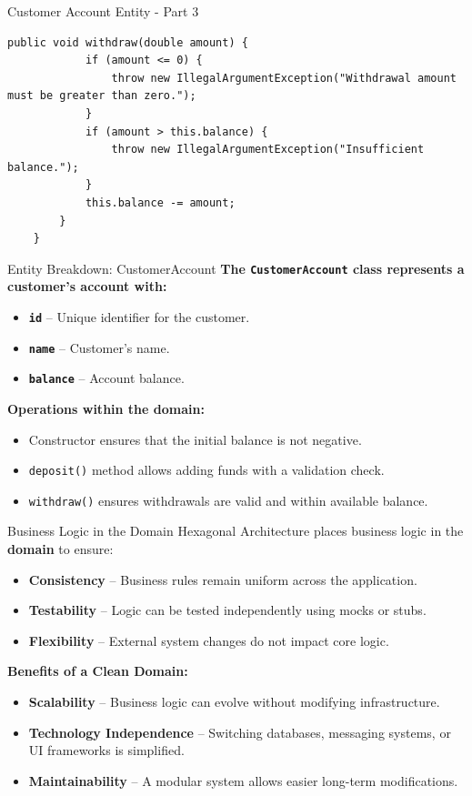 \documentclass[aspectratio=169, table]{beamer}
\begin{document}
\begin{frame}[fragile]{Customer Account Entity - Part 3}
	\vspace{20pt}
	\begin{lstlisting}[style=JavaStyle]
		public void withdraw(double amount) {
			if (amount <= 0) {
				throw new IllegalArgumentException("Withdrawal amount must be greater than zero.");
			}
			if (amount > this.balance) {
				throw new IllegalArgumentException("Insufficient balance.");
			}
			this.balance -= amount;
		}
	}
\end{lstlisting}
\end{frame}


\begin{frame}[fragile]{Entity Breakdown: CustomerAccount}
	\vspace{20pt}
	\textbf{The \texttt{CustomerAccount} class represents a customer’s account with:}
	\begin{itemize}
		\item \textbf{\texttt{id}} – Unique identifier for the customer.
		\item \textbf{\texttt{name}} – Customer’s name.
		\item \textbf{\texttt{balance}} – Account balance.
	\end{itemize}
	
	\textbf{Operations within the domain:}
	\begin{itemize}
		\item Constructor ensures that the initial balance is not negative.
		\item \texttt{deposit()} method allows adding funds with a validation check.
		\item \texttt{withdraw()} ensures withdrawals are valid and within available balance.
	\end{itemize}
\end{frame}

\begin{frame}[fragile]{Business Logic in the Domain}
	\vspace{20pt}
	Hexagonal Architecture places business logic in the \textbf{domain} to ensure:
	\begin{itemize}
		\item \textbf{Consistency} – Business rules remain uniform across the application.
		\item \textbf{Testability} – Logic can be tested independently using mocks or stubs.
		\item \textbf{Flexibility} – External system changes do not impact core logic.
	\end{itemize}
	
	\textbf{Benefits of a Clean Domain:}
	\begin{itemize}
		\item \textbf{Scalability} – Business logic can evolve without modifying infrastructure.
		\item \textbf{Technology Independence} – Switching databases, messaging systems, or UI frameworks is simplified.
		\item \textbf{Maintainability} – A modular system allows easier long-term modifications.
	\end{itemize}
\end{frame}
\end{document}

